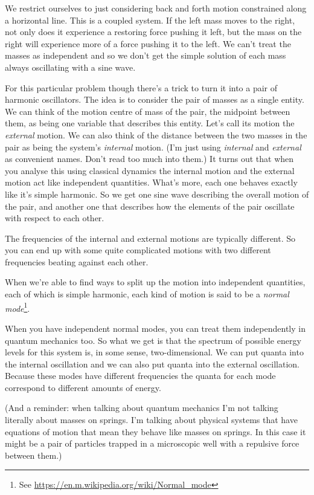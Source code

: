 \documentclass[a4paper]{article}
\begin{document}
We restrict ourselves to just considering back and forth motion constrained along a horizontal line.
This is a coupled system.
If the left mass moves to the right, not only does it experience a restoring force pushing it left, but the mass on the right will experience more of a force pushing it to the left.
We can't treat the masses as independent and so we don't get the simple solution of each mass always oscillating with a sine wave.

For this particular problem though there's a trick to turn it into a pair of harmonic oscillators.
The idea is to consider the pair of masses as a single entity.
We can think of the motion centre of mass of the pair, the midpoint between them, as being one variable that describes this entity.
Let's call its motion the {\em external} motion.
We can also think of the distance between the two masses in the pair as being the system's {\em internal} motion.
(I'm just using {\em internal} and {\em external} as convenient names.
Don't read too much into them.)
It turns out that when you analyse this using classical dynamics the internal motion and the external motion act like independent quantities.
What's more, each one behaves exactly like it's simple harmonic.
So we get one sine wave describing the overall motion of the pair, and another one that describes how the elements of the pair oscillate with respect to each other.

The frequencies of the internal and external motions are typically different.
So you can end up with some quite complicated motions with two different frequencies beating against each other.

When we're able to find ways to split up the motion into independent quantities, each of which is simple harmonic, each kind of motion is said to be a {\em normal mode}\footnote{See \url{https://en.m.wikipedia.org/wiki/Normal_mode}}.

When you have independent normal modes, you can treat them independently in quantum mechanics too.
So what we get is that the spectrum of possible energy levels for this system is, in some sense, two-dimensional.
We can put quanta into the internal oscillation and we can also put quanta into the external oscillation.
Because these modes have different frequencies the quanta for each mode correspond to different amounts of energy.

(And a reminder: when talking about quantum mechanics I'm not talking literally about masses on springs. I'm talking about physical systems that have equations of motion that mean they behave like masses on springs. In this case it might be a pair of particles trapped in a microscopic well with a repulsive force between them.)
\end{document}
